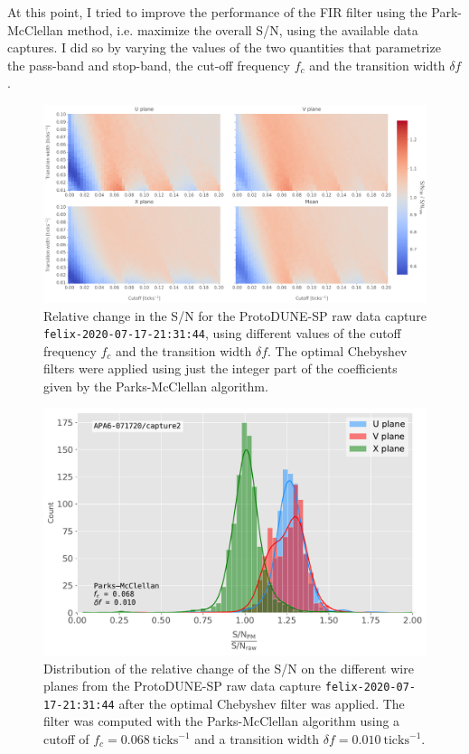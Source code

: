 At this point, I tried to improve the performance of the FIR filter using the Park-McClellan method, i.e. maximize the overall S/N, using the available data captures. I did so by varying the values of the two quantities that parametrize the pass-band and stop-band, the cut-off frequency $f_{c}$ and the transition width $\delta f$.

\begin{figure}[t]
	\centering
	\includegraphics[width=1\linewidth]{Images/Matched_Filter/pm_fir_opt.png}
	\caption[Relative change in the S/N of the ProtoDUNE-SP raw data capture for different values of the cutoff frequency $f_{c}$ and the transition width $\delta f$.]{Relative change in the S/N for the ProtoDUNE-SP raw data capture \texttt{felix-2020-07-17-21:31:44}, using different values of the cutoff frequency $f_{c}$ and the transition width $\delta f$. The optimal Chebyshev filters were applied using just the integer part of the coefficients given by the Parks-McClellan algorithm.}
	\label{fig:fir_opt}
\end{figure}

\begin{figure}[t]
	\centering
	\includegraphics[width=0.85\linewidth]{Images/Matched_Filter/pm_fir_perf}
	\caption[Distribution of the relative change of the S/N on the different wire planes after the optimal FIR filter was applied.]{Distribution of the relative change of the S/N on the different wire planes from the ProtoDUNE-SP raw data capture \texttt{felix-2020-07-17-21:31:44} after the optimal Chebyshev filter was applied. The filter was computed with the Parks-McClellan algorithm using a cutoff of $f_{c} = 0.068 \ \mathrm{ticks}^{-1}$ and a transition width $\delta f = 0.010 \ \mathrm{ticks}^{-1}$.}
	\label{fig:fir_best}
\end{figure}

